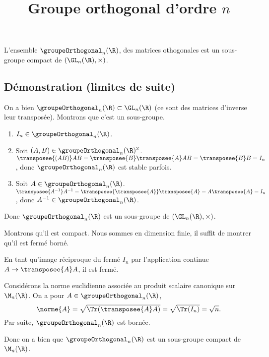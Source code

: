 \documentclass[fontsize=12pt,twoside=false,parskip=half, french]{scrartcl}
\title{Groupe orthogonal d’ordre $n$}
\date{}
\author{}
\begin{document}
\maketitle
   \begin{Theoreme}
      L’ensemble $\groupeOrthogonal_n(\R)$, des matrices othogonales est un sous-groupe compact de $(\GL_n(\R), \times)$.
   \end{Theoreme}
   \subsection{Démonstration (limites de suite)}
      On a bien $\groupeOrthogonal_n(\R) \subset \GL_n(\R)$ (ce sont des matrices d’inverse leur transposée). Montrons que
      c’est un sous-groupe.
      \begin{enumerate}
         \item $I_n \in \groupeOrthogonal_n(\R)$.
         \item Soit $(A, B) \in \groupeOrthogonal_n(\R)^2$. $\transposee{(AB)}AB = \transposee{B}\transposee{A}AB = \transposee{B}B = I_n$, donc
               $\groupeOrthogonal_n(\R)$ est stable parfois.
         \item Soit $A \in \groupeOrthogonal_n(\R)$. $\transposee{A^{-1}}A^{-1} = \transposee{\transposee{A}}\transposee{A} = A\transposee{A} = I_n$,
               donc $A^{-1} \in \groupeOrthogonal_n(\R)$.         
      \end{enumerate}
      Donc $\groupeOrthogonal_n(\R)$ est un sous-groupe de $(\GL_n(\R), \times)$.
      
      Montrons qu’il est compact. Nous sommes en dimension finie, il suffit de montrer qu’il est fermé borné.
      
      En tant qu’image réciproque du fermé ${I_n}$ par l’application continue $A \to \transposee{A}A$, il est fermé.
      
      Considérons la norme euclidienne associée au produit scalaire canonique sur $\M_n(\R)$. On a pour $A \in \groupeOrthogonal_n(\R)$, 
      \[
         \norme{A} = \sqrt{\Tr(\transposee{A}A)} = \sqrt{\Tr(I_n)} = \sqrt{n}.
      \]
      Par suite, $\groupeOrthogonal_n(\R)$ est bornée.
      
      Donc on a bien que $\groupeOrthogonal_n(\R)$ est un sous-groupe compact de $\M_n(\R)$.
\end{document}
